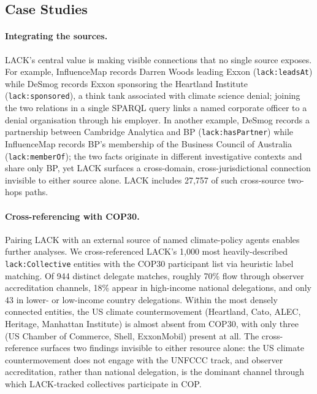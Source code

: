 \vspace{-0.3cm}\subsection{Case Studies}\vspace{-0.2cm}
\label{sec:eval:cases}
\begin{sloppypar}
\paragraph{Integrating the sources.}
LACK's central value is making visible connections that no single source exposes.
For example, InfluenceMap records Darren Woods leading Exxon (\texttt{lack:leadsAt}) while DeSmog records Exxon sponsoring the Heartland Institute (\texttt{lack:sponsored}), a think tank associated with climate science denial; joining the two relations in a single SPARQL query links a named corporate officer to a denial organisation through his employer.
In another example, DeSmog records a partnership between Cambridge Analytica and BP (\texttt{lack:hasPartner}) while InfluenceMap records BP's membership of the Business Council of Australia (\texttt{lack:memberOf}); the two facts originate in different investigative contexts and share only BP, yet LACK surfaces a cross-domain, cross-jurisdictional connection invisible to either source alone.
LACK includes 27{,}757 of such cross-source two-hops paths.
\end{sloppypar}

\begin{sloppypar}\vspace{-0.3cm}
\paragraph{Cross-referencing with COP30.}
Pairing LACK with an external source of named climate-policy agents enables further analyses.
We cross-referenced LACK's 1,000 most heavily-described \texttt{lack:Collective} entities with the COP30 participant list via heuristic label matching.
Of 944 distinct delegate matches, roughly 70\% flow through observer accreditation channels, 18\% appear in high-income national delegations, and only 43 in lower- or low-income country delegations.
Within the most densely connected entities, the US climate countermovement (Heartland, Cato, ALEC, Heritage, Manhattan Institute) is almost absent from COP30, with only three (US Chamber of Commerce, Shell, ExxonMobil) present at all.
The cross-reference surfaces two findings invisible to either resource alone: the US climate countermovement does not engage with the UNFCCC track, and observer accreditation, rather than national delegation, is the dominant channel through which LACK-tracked collectives participate in COP.
\end{sloppypar}

